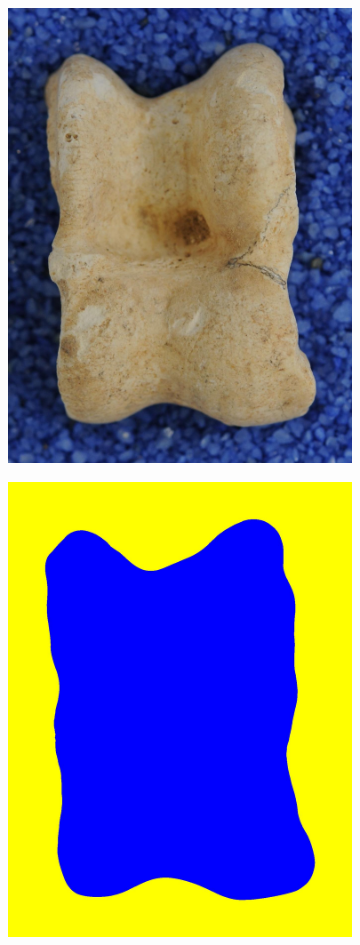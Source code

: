 \documentclass[pdftex,12pt,a4paper]{report}
\begin{document}
\begin{figure}[h]
	\centering
	\begin{subfigure}[b]{0.24\textwidth}
		\centering
		\includegraphics[width=.9\linewidth]{img/segmentation/good/watershed/cut.jpg}
		\subcaption{}
		\label{}
	\end{subfigure}
	\begin{subfigure}[b]{0.24\textwidth}
		\centering
		\includegraphics[width=.9\linewidth]{img/segmentation/good/watershed/segmented.jpg}

\end{subfigure}
\end{figure}
\end{document}
